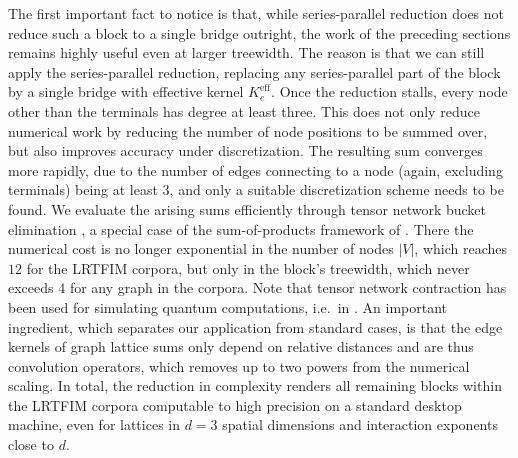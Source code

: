 \documentclass[]{amsart}
\numberwithin{mythm}{section}
\begin{document}
The first important fact to notice is that, while series-parallel reduction does not reduce such a block to a single bridge outright, the work of the preceding sections remains highly useful even at larger treewidth. The reason is that we can still apply the series-parallel reduction, replacing any series-parallel part of the block by a single bridge with effective kernel $K^{\mathrm{eff}}_e$. Once the reduction stalls, every node other than the terminals has degree at least three. This does not only reduce numerical work by reducing the number of node positions to be summed over, but also improves accuracy under discretization.  The resulting sum converges more rapidly, due to the number of edges connecting to a node (again, excluding terminals) being at least $3$, and only a suitable discretization scheme needs to be found. We evaluate the arising sums efficiently through tensor network bucket elimination \cite{Dechter1999}, a special case of the sum-of-products framework of \cite{AjiMcEliece2000}. There the numerical cost is no longer exponential in the number of nodes $|V|$, which reaches $12$ for the LRTFIM corpora, but only in the block's treewidth, which never exceeds $4$ for any graph in the corpora. Note that tensor network contraction has been used for simulating quantum computations, i.e.~in \cite{MarkovShi2008}. An important ingredient, which separates our application from standard cases, is that the edge kernels of graph lattice sums only depend on relative distances and are thus convolution operators, which removes up to two powers from the numerical scaling. In total, the reduction in complexity renders all remaining blocks within the LRTFIM corpora computable to high precision on a standard desktop machine, even for lattices in $d=3$ spatial dimensions and interaction exponents close to $d$.
\end{document}
